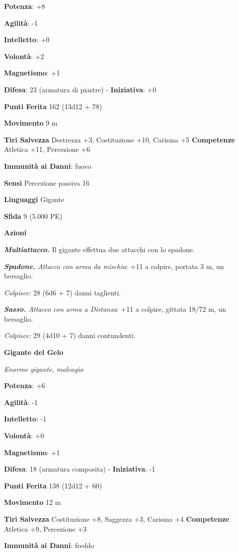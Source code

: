 \begin{multicols}{2}
\textbf{Potenza}: +8

\textbf{Agilità}: -1

\textbf{Intelletto}: +0

\textbf{Volontà}: +2

\textbf{Magnetismo}: +1

\textbf{Difesa}: 23 (armatura di piastre) - \textbf{Iniziativa}: +0

\textbf{Punti Ferita} 162 (13d12 + 78)

\textbf{Movimento} 9 m

\textbf{Tiri Salvezza} Destrezza +3, Costituzione +10, Carisma +5
\textbf{Competenze} Atletica +11, Percezione +6

\textbf{Immunità ai Danni}: fuoco

\textbf{Sensi} Percezione passiva 16

\textbf{Linguaggi} Gigante

\textbf{Sfida} 9 (5.000 PE)\smallskip

\smallskip\textbf{Azioni}

\emph{\textbf{Multiattacco.}} Il gigante effettua due attacchi con lo
spadone.

\emph{\textbf{Spadone.} Attacco con arma da mischia}: +11 a colpire,
portata 3 m, un bersaglio.

\emph{Colpisce:} 28 (6d6 + 7) danni taglienti.

\emph{\textbf{Sasso.} Attacco con arma a Distanza}: +11 a colpire,
gittata 18/72 m, un bersaglio.

\emph{Colpisce:} 29 (4d10 + 7) danni contundenti.

\textbf{Gigante del Gelo}

\emph{Enorme gigante, malvagio}

\textbf{Potenza}: +6

\textbf{Agilità}: -1

\textbf{Intelletto}: -1

\textbf{Volontà}: +0

\textbf{Magnetismo}: +1

\textbf{Difesa}: 18 (armatura composita) - \textbf{Iniziativa}: -1

\textbf{Punti Ferita} 138 (12d12 + 60)

\textbf{Movimento} 12 m

\textbf{Tiri Salvezza} Costituzione +8, Saggezza +3, Carisma +4
\textbf{Competenze} Atletica +9, Percezione +3

\textbf{Immunità ai Danni}: freddo


\end{multicols}
